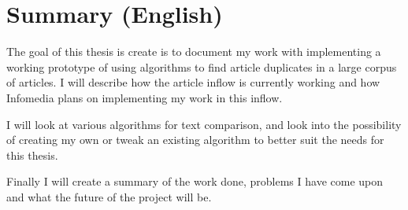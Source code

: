 \chapter{Summary (English)}

The goal of this thesis is create is to document my work with implementing a working prototype of using algorithms to find article duplicates in a large corpus of articles. I will describe how the article inflow is currently working and how Infomedia plans on implementing my work in this inflow.

I will look at various algorithms for text comparison, and look into the possibility of creating my own or tweak an existing algorithm to better suit the needs for this thesis.

Finally I will create a summary of the work done, problems I have come upon and what the future of the project will be.